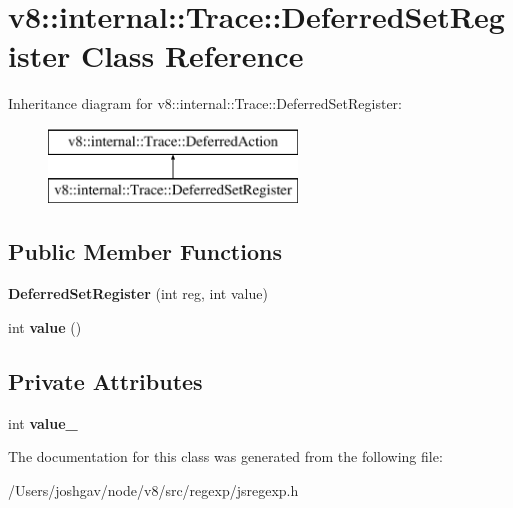\hypertarget{classv8_1_1internal_1_1_trace_1_1_deferred_set_register}{}\section{v8\+:\+:internal\+:\+:Trace\+:\+:Deferred\+Set\+Register Class Reference}
\label{classv8_1_1internal_1_1_trace_1_1_deferred_set_register}
Inheritance diagram for v8\+:\+:internal\+:\+:Trace\+:\+:Deferred\+Set\+Register\+:\begin{figure}[H]
\begin{center}
\leavevmode
\includegraphics[height=2.000000cm]{classv8_1_1internal_1_1_trace_1_1_deferred_set_register}
\end{center}
\end{figure}
\subsection*{Public Member Functions}
\begin{DoxyCompactItemize}
\item 
{\bfseries Deferred\+Set\+Register} (int reg, int value)\hypertarget{classv8_1_1internal_1_1_trace_1_1_deferred_set_register_a04d1c5f24542781c0fb02301b52a3643}{}\label{classv8_1_1internal_1_1_trace_1_1_deferred_set_register_a04d1c5f24542781c0fb02301b52a3643}

\item 
int {\bfseries value} ()\hypertarget{classv8_1_1internal_1_1_trace_1_1_deferred_set_register_ac96ce7953b4e0299586de0dcbc674fc6}{}\label{classv8_1_1internal_1_1_trace_1_1_deferred_set_register_ac96ce7953b4e0299586de0dcbc674fc6}

\end{DoxyCompactItemize}
\subsection*{Private Attributes}
\begin{DoxyCompactItemize}
\item 
int {\bfseries value\+\_\+}\hypertarget{classv8_1_1internal_1_1_trace_1_1_deferred_set_register_ac00a5e5215d0c53ab6684f7cf3dafa3b}{}\label{classv8_1_1internal_1_1_trace_1_1_deferred_set_register_ac00a5e5215d0c53ab6684f7cf3dafa3b}

\end{DoxyCompactItemize}


The documentation for this class was generated from the following file\+:\begin{DoxyCompactItemize}
\item 
/\+Users/joshgav/node/v8/src/regexp/jsregexp.\+h\end{DoxyCompactItemize}
